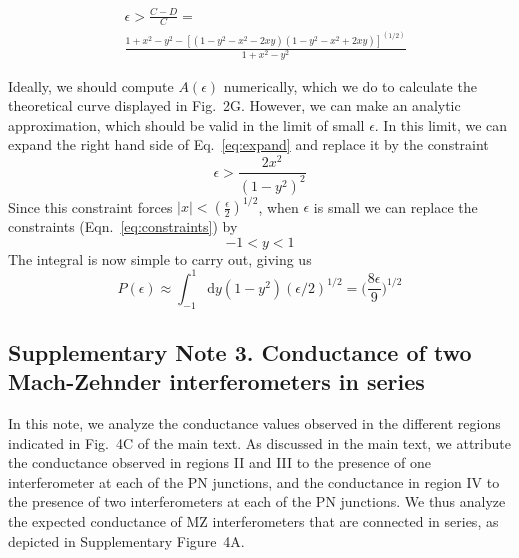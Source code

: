 \documentclass[%
reprint,amsmath,amssymb,aps,prl,superscriptaddress,
twocolumn
]{revtex4-1}
\begin{document}
		\begin{equation}
		\begin{split}
		&\epsilon > \frac{C-D}{C} = \\ &\frac{1+x^2-y^2-[(1-y^2-x^2-2xy)(1-y^2-x^2+2xy)]^{(1/2)}}{1+x^2-y^2}
		\end{split}
		\label{eq:expand}
		\end{equation}
		
		Ideally, we should compute $A(\epsilon)$ numerically, which we do to calculate the theoretical curve displayed in Fig.~2G. However, we can make an analytic approximation, which should be valid in the limit of small $\epsilon$. In this limit, we can expand the right hand side of Eq.~\ref{eq:expand} and replace it by the constraint
		\begin{equation}
		\epsilon > \frac{2x^2}{(1-y^2)^2} 
		\end{equation}
		Since this constraint forces $|x|< (\frac{\epsilon}{2})^{1/2}$, when $\epsilon$ is small we can replace the constraints (Eqn.~\ref{eq:constraints}) by
		\begin{equation}
		-1 < y < 1 
		\end{equation}
		The integral is now simple to carry out, giving us
		\begin{equation}
		P(\epsilon) \approx \int^1_{-1} \mathrm{d}y (1-y^2)(\epsilon/2)^{1/2} = \bigg(\frac{8\epsilon}{9} \bigg) ^{1/2} 
		\end{equation}
		
		
		\subsection{Supplementary Note 3. Conductance of two Mach-Zehnder interferometers in series}
		
		In this note, we analyze the conductance values observed in the different regions indicated in Fig.~4C of the main text. As discussed in the main text, we attribute the conductance observed in regions II and III to the presence of one interferometer at each of the PN junctions, and the conductance in region IV to the presence of two interferometers at each of the PN junctions. We thus analyze the expected conductance of MZ interferometers that are connected in series, as depicted in Supplementary Figure~4A.
		
\end{document}
